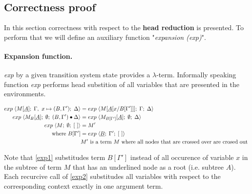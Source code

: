 \documentclass[a4paper, 10pt]{article}
\begin{document}
\subsection{Correctness proof}
In this section correctness with respect to the \textbf{head reduction} is presented.
To perform that we will define an auxiliary function "\emph{expansion (exp)}".

\paragraph{Expansion function.} 
\emph{exp} by a given transition system state provides a $\lambda$-term.
Informally speaking function \emph{exp} performs head substition of all
variables that are presented in the environments.

\begin{align}
  \label{exp1} exp\; \langle M[\underline{A}];\; \Gamma,\ x \mapsto (B, \Gamma');\; \Delta \rangle
  &= exp\; \langle M[\underline{A}[x / B[\Gamma']]];\; \Gamma;\; \Delta \rangle \\
  \label{exp2} exp\; \langle M_B[\underline{A}];\; \emptyset;\; (B,\Gamma')\bullet\Delta \rangle
  &= exp\; \langle M_{B[\Gamma']}[\underline{A}];\; \emptyset;\; \Delta \rangle\\
  \label{exp3} exp\; \langle M;\; \emptyset;\; [\ ] \rangle &= M' \\
  \textnormal{where } B[\Gamma'] &= exp\; \langle \underline{B};\; \Gamma';\; [\ ] \rangle \\
  & M' \textnormal{ is a term } M \textnormal{ where all nodes that are crossed over are crosed out }
\end{align}

Note that \eqref{exp1} substitudes term $B[\Gamma']$ instead of all occurence of variable $x$ in the subtree of term $M$ that has an underlined node as a root (i.e. subtree $A$). Each recurcive call of \eqref{exp2} substitudes all variables with respect to the corresponding context exactly in one argument term.
\end{document}
